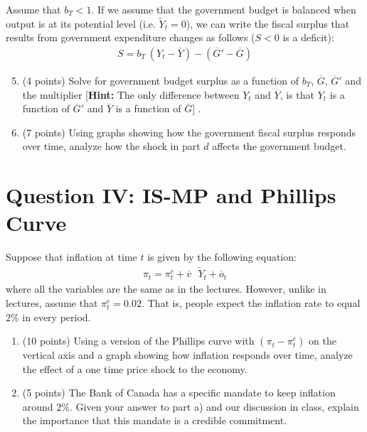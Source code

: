 \documentclass[letterpaper,12pt]{article}
\theoremstyle{dotlessS}
\begin{document}
\vspace{0.1in}
\noindent Assume that $b_T<1$.  If we assume that the government budget is balanced when output is at its potential level (i.e. $\widetilde{Y}_t=0$), we can write the fiscal surplus that results from government expenditure changes as follows ($S<0$ is a deficit):
\begin{eqnarray*}
S=b_T \: (Y_t-\overline{Y})-(\overline{G}'-\overline{G})  
\end{eqnarray*}
\begin{enumerate}[label=(\alph*)]
\setcounter{enumi}{4}
\item (4 points) Solve for government budget surplus as a function of $b_T$, $\overline{G}$, $\overline{G}'$ and the multiplier [\textbf{Hint:} The only difference between $Y_t$ and $\overline{Y}$, is that $Y_t$ is a function of $\overline{G}'$ and $\overline{Y}$ is a function of $\overline{G}$] .
\item (7 points) Using graphs showing how the government fiscal surplus responds over time, analyze how the shock in part $d$ affects the government budget. 
\end{enumerate}   


\section*{Question IV: IS-MP and Phillips Curve}
Suppose that inflation at time $t$ is given by the following equation:
\begin{eqnarray*}
\pi_t=\pi^e_t+\overline{v} \: \: \: \widetilde{Y}_t+\overline{o}_t
\end{eqnarray*} 
where all the variables are the same as in the lectures. However, unlike in lectures, assume that $\pi^e_t=0.02$. That is, people expect the inflation rate to equal $2\%$ in every period.
\begin{enumerate}[label=(\alph*)]
\item (10 points) Using a version of the Phillips curve with $(\pi_t-\pi^e_t)$ on the vertical axis and a graph showing how inflation responds over time, analyze the effect of a one time price shock to the economy.
\item (5 points) The Bank of Canada has a specific mandate to keep inflation around $2\%$. Given your answer to part a) and our discussion in class, explain the importance that this mandate is a credible commitment.
 
\end{enumerate}
\end{document}
